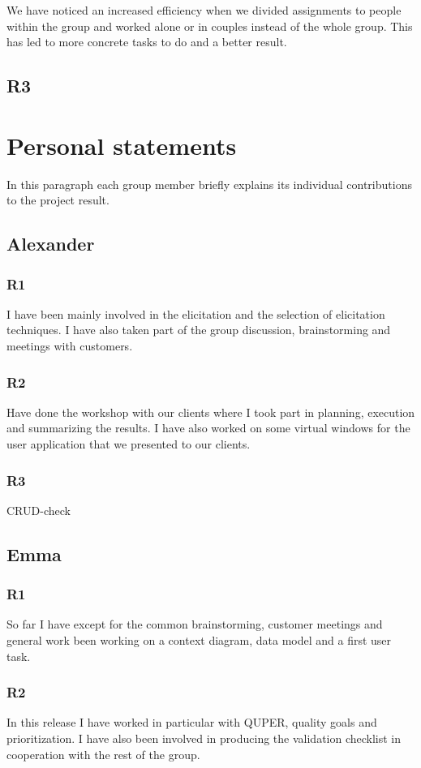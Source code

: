 \documentclass[a4paper]{article}
\begin{document}
We have noticed an increased efficiency when we divided assignments to people within the group and worked alone or in couples instead of the whole group. This has led to more concrete tasks to do and a better result.

\subsection{R3}

	\section{Personal statements}
In this paragraph each group member briefly explains its individual contributions to the project result.
	
	\subsection{Alexander}
		\subsubsection{R1}
		I have been mainly involved in the elicitation and the selection of elicitation techniques. I have also taken part of the group discussion, brainstorming and meetings with customers.
		\subsubsection{R2}
		Have done the workshop with our clients where I took part in planning, execution and summarizing the results. I have also worked on some virtual windows for the user application that we presented to our clients. 
		\subsubsection{R3}
			CRUD-check			
			
	\subsection{Emma}
		\subsubsection{R1}
		So far I have except for the common brainstorming, customer meetings and general work been working on a context diagram, data model and a first user task.
		\subsubsection{R2}
	In this release I have worked in particular with QUPER, quality goals and prioritization. I have also been involved in producing the validation checklist in cooperation with the rest of the group.
\end{document}
